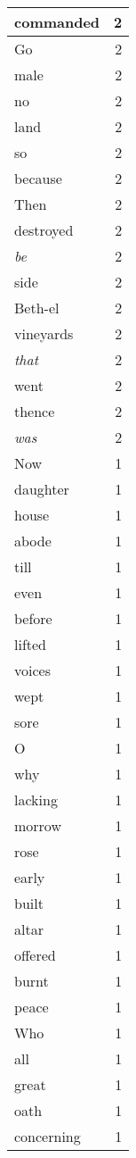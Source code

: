 \begin{center}
\begin{longtable}{l|r}
commanded & 2 \\ \hline
Go & 2 \\ \hline
male & 2 \\ \hline
no & 2 \\ \hline
land & 2 \\ \hline
so & 2 \\ \hline
because & 2 \\ \hline
Then & 2 \\ \hline
destroyed & 2 \\ \hline
\emph{be} & 2 \\ \hline
side & 2 \\ \hline
Beth-el & 2 \\ \hline
vineyards & 2 \\ \hline
\emph{that} & 2 \\ \hline
went & 2 \\ \hline
thence & 2 \\ \hline
\emph{was} & 2 \\ \hline
Now & 1 \\ \hline
daughter & 1 \\ \hline
house & 1 \\ \hline
abode & 1 \\ \hline
till & 1 \\ \hline
even & 1 \\ \hline
before & 1 \\ \hline
lifted & 1 \\ \hline
voices & 1 \\ \hline
wept & 1 \\ \hline
sore & 1 \\ \hline
O & 1 \\ \hline
why & 1 \\ \hline
lacking & 1 \\ \hline
morrow & 1 \\ \hline
rose & 1 \\ \hline
early & 1 \\ \hline
built & 1 \\ \hline
altar & 1 \\ \hline
offered & 1 \\ \hline
burnt & 1 \\ \hline
peace & 1 \\ \hline
Who & 1 \\ \hline
all & 1 \\ \hline
great & 1 \\ \hline
oath & 1 \\ \hline
concerning & 1 \\ \hline

\end{longtable}
\end{center}
